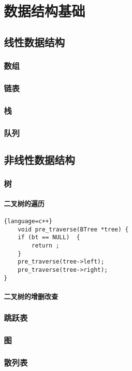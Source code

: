 \chapter{数据结构基础}
\section{线性数据结构}
\subsection{数组}
\subsection{链表}
\subsection{栈}
\subsection{队列}
\section{非线性数据结构}
\subsection{树}
\subsubsection{二叉树的遍历}

\begin{lstlisting}{language=c++}
	void pre_traverse(BTree *tree) {
	if (bt == NULL)  {
		return ; 
	}
	pre_traverse(tree->left); 
	pre_traverse(tree->right); 
}

\end{lstlisting}

\subsubsection{二叉树的增删改查}

\subsection{跳跃表}
\subsection{图}
\subsection{散列表}
